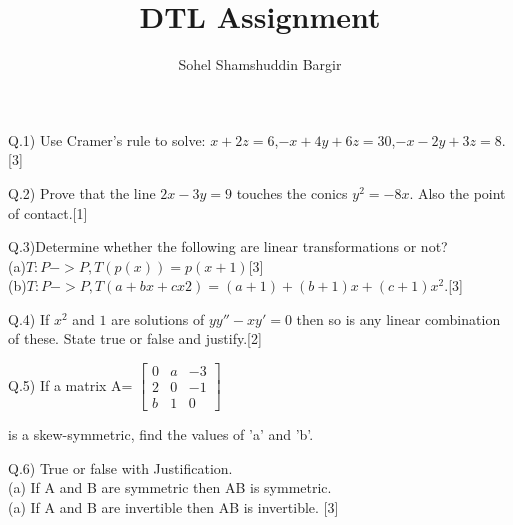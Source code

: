 \documentclass[12pt]{article}
\title{DTL Assignment }
\author{Sohel Shamshuddin Bargir}
\begin{document}
\maketitle
\newpage
{}
\begin{flushleft}
Q.1) Use Cramer's rule to solve: $x+2z=6$,$-x+4y+6z=30$,$-x-2y+3z=8$. \hspace{4cm}[3]\\ 
\end{flushleft} 


\begin{flushleft}
 Q.2) Prove that the line $2x-3y=9$ touches the conics $y^2=-8x$. Also the point of contact.\hspace{10cm}[1]
\end{flushleft}

\begin{flushleft}
 Q.3)Determine whether the following are linear transformations or not?\\
(a)$T:P -> P , T(p(x))=p(x+1) $\hspace{7cm}[3]\\
(b)$T:P -> P , T(a+bx+cx2)=(a+1) + (b+1)x + (c+1)x^2. $\hspace{1.5cm}[3]
\end{flushleft}


\begin{flushleft}
Q.4) If $x^2$ and $1$ are solutions of $yy''-xy'=0$ then so is any linear combination of these. State true or false and justify.\hspace{3.7cm}[2]
\end{flushleft}

\begin{flushleft}
Q.5) If a matrix  A=
$\begin{bmatrix}
0 & a & -3\\
2 & 0 & -1\\
b & 1 & 0
\end{bmatrix}$

is a skew-symmetric, find the values of 'a' and 'b'.
\end{flushleft}

\begin{flushleft}
Q.6) True or false with Justification.\\ 
	(a) If A and B are symmetric then AB is symmetric.\\
	(a) If A and B are invertible then AB is invertible.
\hspace{4cm}[3]
\end{flushleft}
\end{document}
